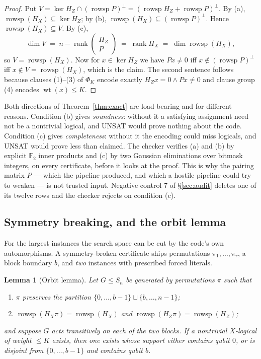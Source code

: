\documentclass[11pt]{amsart}
\newcommand{\FF}{\mathbb{F}_{2}}
\newcommand{\rowsp}{\operatorname{rowsp}}
\newcommand{\rank}{\operatorname{rank}}
\newcommand{\wt}{\operatorname{wt}}
\newcommand{\HX}{H_{X}}
\newcommand{\HZ}{H_{Z}}
\theoremstyle{plain}
\newtheorem{lemma}[theorem]{Lemma}
\theoremstyle{definition}
\theoremstyle{remark}
\begin{document}
\begin{proof}
Put $V=\ker\HZ\cap(\rowsp P)^{\perp}=(\rowsp\HZ+\rowsp P)^{\perp}$.
By (a), $\rowsp(\HX)\subseteq\ker\HZ$; by (b), $\rowsp(\HX)\subseteq
(\rowsp P)^{\perp}$. Hence $\rowsp(\HX)\subseteq V$. By (c),
\[
  \dim V \;=\; n-\rank\begin{pmatrix}\HZ\\P\end{pmatrix}\;=\;\rank\HX
  \;=\;\dim\rowsp(\HX),
\]
so $V=\rowsp(\HX)$. Now for $x\in\ker\HZ$ we have $Px\neq 0$ iff
$x\notin(\rowsp P)^{\perp}$ iff $x\notin V=\rowsp(\HX)$, which is the claim.
The second sentence follows because clauses (1)--(3) of $\Phi_{K}$ encode
exactly $\HZ x=0\wedge Px\neq0$ and clause group (4) encodes $\wt(x)\le K$.
\end{proof}

Both directions of Theorem~\ref{thm:exact} are load-bearing and for different
reasons. Condition (b) gives \emph{soundness}: without it a satisfying
assignment need not be a nontrivial logical, and UNSAT would prove nothing
about the code. Condition (c) gives \emph{completeness}: without it the
encoding could miss logicals, and UNSAT would prove less than claimed. The
checker verifies (a) and (b) by explicit $\FF$ inner products and (c) by two
Gaussian eliminations over bitmask integers, on every certificate, before it
looks at the proof. This is why the pairing matrix $P$ --- which the pipeline
produced, and which a hostile pipeline could try to weaken --- is not trusted
input. Negative control 7 of \S\ref{sec:audit} deletes one of its twelve rows
and the checker rejects on condition (c).

\subsection{Symmetry breaking, and the orbit lemma}\label{ssec:sym}
For the largest instances the search space can be cut by the code's own
automorphisms. A symmetry-broken certificate ships permutations
$\pi_{1},\dots,\pi_{r}$, a block boundary $b$, and \emph{two} instances with
prescribed forced literals.

\begin{lemma}[Orbit lemma]\label{lem:orbit}
Let $G\le S_{n}$ be generated by permutations $\pi$ such that
\begin{enumerate}
\item[(i)] $\pi$ preserves the partition $\{0,\dots,b-1\}\sqcup\{b,\dots,n-1\}$;
\item[(ii)] $\rowsp(\HX\pi)=\rowsp(\HX)$ and $\rowsp(\HZ\pi)=\rowsp(\HZ)$;
\end{enumerate}
and suppose $G$ acts transitively on each of the two blocks. If a nontrivial
$X$-logical of weight $\le K$ exists, then one exists whose support either
contains qubit $0$, or is disjoint from $\{0,\dots,b-1\}$ and contains qubit
$b$.
\end{lemma}
\end{document}
